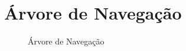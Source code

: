 %
%
%
\chapter{Árvore de Navegação} \label{ap:b}

\begin{figure}[h]
	\begin{center}
	\end{center}
	\caption{Árvore de Navegação}\label{fig:arv}
\end{figure}